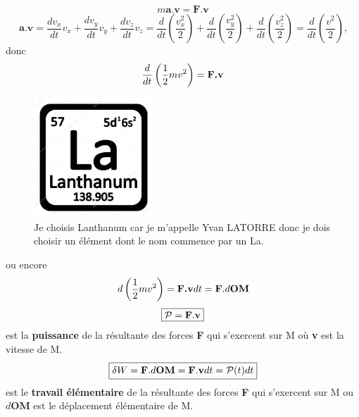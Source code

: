 \documentclass[a4paper, 12pt]{article}
\begin{document}
            $$m\textbf{a.v} = \textbf{F.v}$$
            $$\textbf{a.v} = \frac{dv_x}{dt}v_x + \frac{dv_y}{dt}v_y + \frac{dv_z}{dt}v_z = \frac{d}{dt}
            \left(\frac{v_{x}^{2}}{2}\right) + \frac{d}{dt}
            \left(\frac{v_{y}^{2}}{2}\right) + \frac{d}{dt}
            \left(\frac{v_{z}^{2}}{2}\right) = \frac{d}{dt} \left(\frac{v^2}{2}\right)\text{,}$$
            donc
            $$\frac{d}{dt} \left(\frac{1}{2}mv^2\right) = \text{\textbf{F.v}}$$            
            \newpage

            \begin{figure}
                \centering
                    \includegraphics[width=0.4\textwidth]{Lanthanum.jpg}
                    \caption{Je choisis Lanthanum car je m'appelle Yvan LATORRE donc je dois choisir un \'el\'ement dont le nom commence par un La.}
                    \label{img}
                
            \end{figure}
            \flushleft
            ou encore
            $$d \left(\frac{1}{2}mv^2\right) = \text{\textbf{F.v}$dt$} = \text{\textbf{F}}.d \text{\textbf{OM}}$$
            $$\boxed{$$\mathcal{P} = \text{\textbf{F}.\textbf{v}}$$}$$
            est la \textbf{puissance} de la r\'esultante des forces \textbf{F} qui s'exercent sur M o\`u \textbf{v} est la vitesse de M.
            $$\boxed{$$\delta W = \text{\textbf{F}}.d\text{\textbf{OM}} = \text{\textbf{F}.\textbf{v}}dt = \mathcal{P}(t)dt$$}$$
            est le \textbf{travail \'el\'ementaire} de la r\'esultante des forces \textbf{F} qui s'exercent sur M ou $d\textbf{OM}$ est le d\'eplacement \'el\'ementaire de M.
\end{document}
